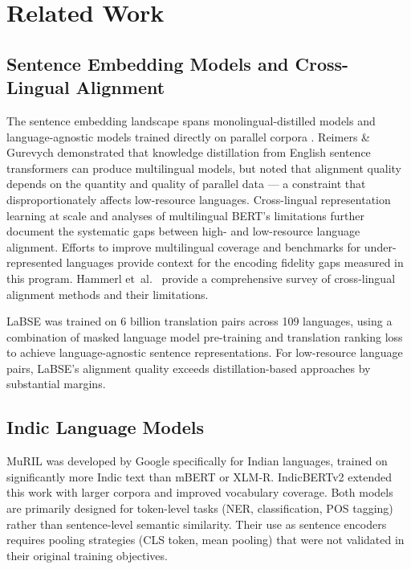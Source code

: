 \documentclass[11pt,a4paper]{article}
\begin{document}
\section{Related Work}

\subsection{Sentence Embedding Models and Cross-Lingual Alignment}

The sentence embedding landscape spans monolingual-distilled models
\citep{reimers2020,reimers2019} and language-agnostic models trained directly on parallel
corpora \citep{feng2022,artetxe2019}. Reimers \& Gurevych \citep{reimers2020} demonstrated
that knowledge distillation from English sentence transformers can produce multilingual
models, but noted that alignment quality depends on the quantity and quality of parallel
data --- a constraint that disproportionately affects low-resource languages. Cross-lingual
representation learning at scale \citep{conneau2020} and analyses of multilingual BERT's
limitations \citep{pires2019} further document the systematic gaps between high- and
low-resource language alignment. Efforts to improve multilingual coverage \citep{nllb2022}
and benchmarks for under-represented languages \citep{ruder2023} provide context for the
encoding fidelity gaps measured in this program. Hammerl et~al.\ \citep{hammerl2024}
provide a comprehensive survey of cross-lingual alignment methods and their limitations.

LaBSE \citep{feng2022} was trained on 6 billion translation pairs across 109 languages,
using a combination of masked language model pre-training and translation ranking loss to
achieve language-agnostic sentence representations. For low-resource language pairs,
LaBSE's alignment quality exceeds distillation-based approaches by substantial margins.

\subsection{Indic Language Models}

MuRIL \citep{khanuja2021} was developed by Google specifically for Indian languages,
trained on significantly more Indic text than mBERT or XLM-R. IndicBERTv2
\citep{doddapaneni2023} extended this work with larger corpora and improved vocabulary
coverage. Both models are primarily designed for token-level tasks (NER, classification,
POS tagging) rather than sentence-level semantic similarity. Their use as sentence
encoders requires pooling strategies (CLS token, mean pooling) that were not validated
in their original training objectives.
\end{document}
